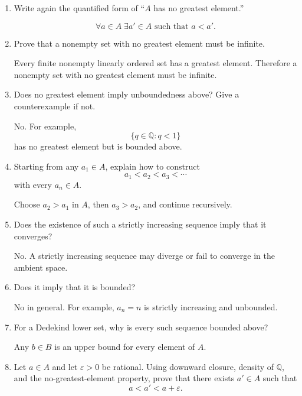 \documentclass{self-check}
\begin{document}
\begin{enumerate}[label=\arabic{*}., itemsep=10pt]
  \item Write again the quantified form of ``\(A\) has no greatest element.''

    \begin{answer}
      \[ \forall a\in A\;\exists a'\in A\text{ such that }a<a'. \]
    \end{answer}
  \item Prove that a nonempty set with no greatest element must be infinite.

    \begin{answer}
      Every finite nonempty linearly ordered set has a greatest element. Therefore a nonempty set with no greatest element must be infinite.
    \end{answer}
  \item Does no greatest element imply unboundedness above? Give a counterexample if not.

    \begin{answer}
      No. For example,
      \[ \{q\in\mathbb{Q}:q<1\} \]
      has no greatest element but is bounded above.
    \end{answer}
  \item Starting from any \(a_{1}\in A\), explain how to construct
    \[ a_{1}<a_{2}<a_{3}<\cdots \]
    with every \(a_{n}\in A\).

    \begin{answer}
      Choose \(a_{2}>a_{1}\) in \(A\), then \(a_{3}>a_{2}\), and continue recursively.
    \end{answer}
  \item Does the existence of such a strictly increasing sequence imply that it converges?

    \begin{answer}
      No. A strictly increasing sequence may diverge or fail to converge in the ambient space.
    \end{answer}
  \item Does it imply that it is bounded?

    \begin{answer}
      No in general. For example, \(a_{n}=n\) is strictly increasing and unbounded.
    \end{answer}
  \item For a Dedekind lower set, why is every such sequence bounded above?

    \begin{answer}
      Any \(b\in B\) is an upper bound for every element of \(A\).
    \end{answer}
  \item Let \(a\in A\) and let \(\varepsilon>0\) be rational. Using downward closure, density of \(\mathbb{Q}\), and the no-greatest-element property, prove that there exists \(a'\in A\) such that
    \[ a<a'<a+\varepsilon. \]


\end{enumerate}
\end{document}
